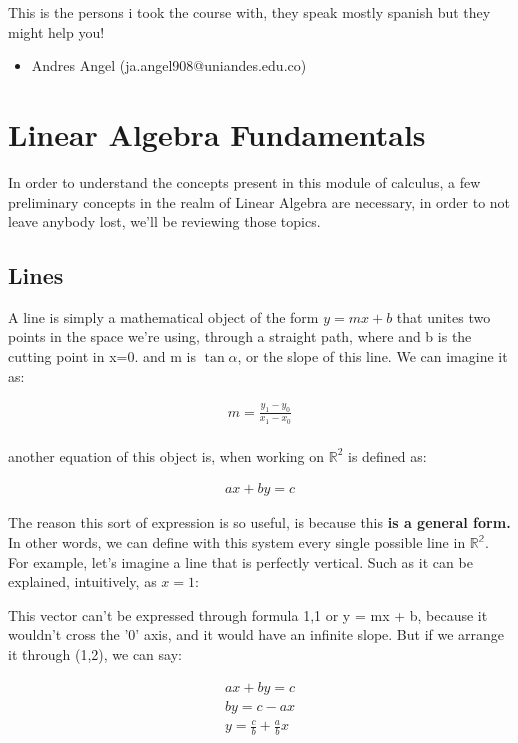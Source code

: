\documentclass[11pt,fleqn]{book} %
\begin{document}
This is the persons i took the course with, they speak mostly spanish but they might help you!
\begin{itemize}
    \item Andres Angel (ja.angel908@uniandes.edu.co)    
\end{itemize}

\chapter{Linear Algebra Fundamentals}

In order to understand the concepts present in this module of calculus, a few preliminary concepts
in the realm of Linear Algebra are necessary, in order to not leave anybody lost, we'll be reviewing those topics.

\section{Lines}

A line is simply a mathematical object of the form $ y = mx + b $ that unites two points in the space we're using, through a straight path, where and b is the cutting point in x=0.
and m is $\tan{\alpha}$, or the slope of this line. We can imagine it as:

\begin{gather}
    m = \frac{y_1 - y_0}{x_1 - x_0} \\
\end{gather}

another equation of this object is, when working on $\mathbb{R}^2$
is defined as:

\begin{gather}
    ax + by = c
\end{gather}

The reason this sort of expression is so useful, is because this \textbf{is a general form.} In other words, we can define with this system every single possible line in $\mathbb{R^2}$.
For example, let's imagine a line that is perfectly vertical. Such as it can be explained, intuitively, as $x = 1$:


This vector can't be expressed through formula 1,1 or y = mx + b, because it wouldn't cross the '0' axis, and it would have an infinite slope. But if we arrange it through (1,2), we can say:

\begin{gather}
ax + by = c\\
by = c - ax\\
y = \frac{c}{b} + \frac{a}{b} x
\end{gather}
\end{document}

